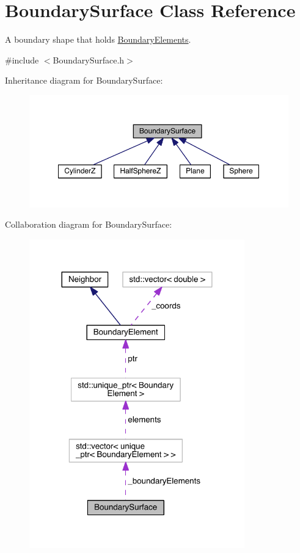 \hypertarget{classBoundarySurface}{\section{Boundary\+Surface Class Reference}
\label{classBoundarySurface}
}


A boundary shape that holds \hyperlink{classBoundaryElement}{Boundary\+Elements}.  




{\ttfamily \#include $<$Boundary\+Surface.\+h$>$}



Inheritance diagram for Boundary\+Surface\+:\nopagebreak
\begin{figure}[H]
\begin{center}
\leavevmode
\includegraphics[width=350pt]{classBoundarySurface__inherit__graph}
\end{center}
\end{figure}


Collaboration diagram for Boundary\+Surface\+:\nopagebreak
\begin{figure}[H]
\begin{center}
\leavevmode
\includegraphics[width=264pt]{classBoundarySurface__coll__graph}
\end{center}
\end{figure}
